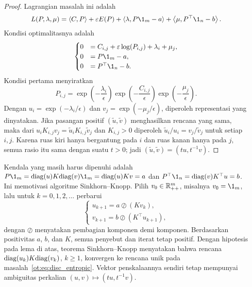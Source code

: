 \begin{proof}
    Lagrangian masalah ini adalah
    \begin{equation}
        L(P,\lambda,\mu)
        =\inner{C}{P}+\epsilon E(P)
        +\inner{\lambda}{P\1_m-a}
        +\inner{\mu}{P^\top\1_n-b}.
    \end{equation}
    Kondisi optimalitasnya adalah
    \begin{equation}
        \begin{cases}
            0&=C_{i,j}+\epsilon\log(P_{i,j})+\lambda_i+\mu_j,\\
            0&=P\1_m-a,\\
            0&=P^\top\1_n-b.
        \end{cases}
    \end{equation}
    Kondisi pertama menyiratkan
    \begin{equation}
        P_{i,j}
        =\exp\left(-\frac{\lambda_i}{\epsilon}\right)
        \exp\left(-\frac{C_{i,j}}{\epsilon}\right)
        \exp\left(-\frac{\mu_j}{\epsilon}\right).
    \end{equation}
    Dengan $u_i=\exp(-\lambda_i/\epsilon)$ dan
    $v_j=\exp(-\mu_j/\epsilon)$, diperoleh representasi yang dinyatakan.
    Jika pasangan positif $(\tilde u,\tilde v)$ menghasilkan rencana yang sama,
    maka dari $u_iK_{i,j}v_j=\tilde u_iK_{i,j}\tilde v_j$ dan $K_{i,j}>0$
    diperoleh $\tilde u_i/u_i=v_j/\tilde v_j$ untuk setiap $i,j$. Karena ruas
    kiri hanya bergantung pada $i$ dan ruas kanan hanya pada $j$, semua rasio
    itu sama dengan suatu $t>0$; jadi $(\tilde u,\tilde v)=(tu,t^{-1}v)$.
\end{proof}

Kendala yang masih harus dipenuhi adalah
$P\1_m=\diag(u)K\diag(v)\1_m=\diag(u)Kv=a$ dan
$P^\top\1_n=\diag(v)K^\top u=b$. Ini memotivasi algoritme
Sinkhorn--Knopp. Pilih $v_0\in\mathbb{R}_{++}^m$, misalnya $v_0=\1_m$, lalu untuk
$k=0,1,2,\dots$ perbarui
\begin{equation}
    \begin{cases}
        u_{k+1}=a\oslash(Kv_k),\\
        v_{k+1}=b\oslash(K^\top u_{k+1}),
    \end{cases}
\end{equation}
dengan $\oslash$ menyatakan pembagian komponen demi komponen. Berdasarkan
positivitas $a$, $b$, dan $K$, semua penyebut dan iterat tetap positif.
Dengan hipotesis pada lema di atas, teorema Sinkhorn--Knopp menyatakan bahwa rencana
$\mathrm{diag}(u_k)K\mathrm{diag}(v_k)$, $k\geq1$, konvergen ke rencana unik pada
masalah~\eqref{ot:eq:disc_entropic}. Vektor penskalaannya sendiri tetap
mempunyai ambiguitas perkalian $(u,v)\mapsto(tu,t^{-1}v)$.
